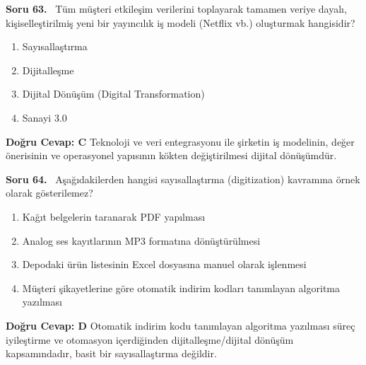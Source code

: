 \documentclass[11pt,a4paper,openany]{book}
\begin{document}
\needspace{5cm}
\vspace{8pt}
\noindent\textbf{\large\sffamily Soru 63.} \ Tüm müşteri etkileşim verilerini toplayarak tamamen veriye dayalı, kişiselleştirilmiş yeni bir yayıncılık iş modeli (Netflix vb.) oluşturmak hangisidir?
\begin{enumerate}[label=\Alph*), leftmargin=25pt, topsep=4pt, itemsep=2pt]
    \item Sayısallaştırma
    \item Dijitalleşme
    \item Dijital Dönüşüm (Digital Transformation)
    \item Sanayi 3.0
\end{enumerate}
\vspace{4pt}
\begin{tcolorbox}[title=Cevap ve Açıklama, colback=gray!3!white, colframe=primarycolor!90!black, arc=2mm, fonttitle=\bfseries\sffamily, top=6pt, bottom=6pt]
    \textbf{Doğru Cevap: C}
    \vspace{2pt}
    Teknoloji ve veri entegrasyonu ile şirketin iş modelinin, değer önerisinin ve operasyonel yapısının kökten değiştirilmesi dijital dönüşümdür.
\end{tcolorbox}
\vspace{10pt}

\needspace{5cm}
\vspace{8pt}
\noindent\textbf{\large\sffamily Soru 64.} \ Aşağıdakilerden hangisi sayısallaştırma (digitization) kavramına örnek olarak gösterilemez?
\begin{enumerate}[label=\Alph*), leftmargin=25pt, topsep=4pt, itemsep=2pt]
    \item Kağıt belgelerin taranarak PDF yapılması
    \item Analog ses kayıtlarının MP3 formatına dönüştürülmesi
    \item Depodaki ürün listesinin Excel dosyasına manuel olarak işlenmesi
    \item Müşteri şikayetlerine göre otomatik indirim kodları tanımlayan algoritma yazılması
\end{enumerate}
\vspace{4pt}
\begin{tcolorbox}[title=Cevap ve Açıklama, colback=gray!3!white, colframe=primarycolor!90!black, arc=2mm, fonttitle=\bfseries\sffamily, top=6pt, bottom=6pt]
    \textbf{Doğru Cevap: D}
    \vspace{2pt}
    Otomatik indirim kodu tanımlayan algoritma yazılması süreç iyileştirme ve otomasyon içerdiğinden dijitalleşme/dijital dönüşüm kapsamındadır, basit bir sayısallaştırma değildir.
\end{tcolorbox}
\vspace{10pt}
\end{document}
